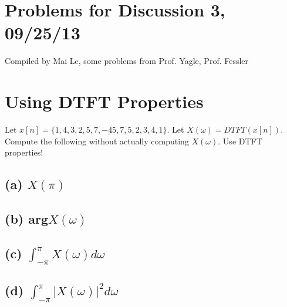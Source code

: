 \documentclass[11pt]{article}
\begin{document}
\section*{Problems for Discussion 3, 09/25/13}
Compiled by Mai Le, some problems from Prof. Yagle, Prof. Fessler

\section{Using DTFT Properties}

Let $x[n] = \{1,4,3,2,5,7,\underline{-45},7,5,2,3,4,1\}$. Let $X(\omega)=DTFT(x[n])$. Compute the following without actually computing $X(\omega)$. Use DTFT properties!

\subsection{(a) $X(\pi)$}

%

\subsection{(b) arg$X(\omega)$}


\subsection{(c) $\int_{-\pi}^\pi X(\omega) d\omega$}

%
%


\subsection{(d) $\int_{-\pi}^\pi |X(\omega)|^2 d\omega$}

%
%
%
%
%
%
\end{document}
